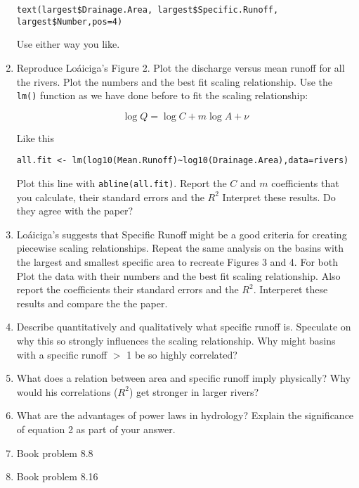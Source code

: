 \documentclass[11pt]{article}
\begin{document}
\begin{enumerate}
\begin{verbatim}
text(largest$Drainage.Area, largest$Specific.Runoff, largest$Number,pos=4)
\end{verbatim}

Use either way you like. 

\item Reproduce Lo\'aiciga's Figure 2.  Plot the discharge versus mean runoff for all the rivers. Plot the numbers and the best fit scaling relationship.  Use the \texttt{lm()} function as we have done before to fit the scaling relationship:

$$\log Q=\log C+m\log A+\nu$$

Like this

\begin{verbatim}
all.fit <- lm(log10(Mean.Runoff)~log10(Drainage.Area),data=rivers)
\end{verbatim}

Plot this line with \texttt{abline(all.fit)}.  Report the $C$ and $m$ coefficients that you calculate, their standard errors and the $R^2$  Interpret these results. Do they agree with the paper?

\item Lo\'aiciga's suggests that Specific Runoff might be a good criteria for creating piecewise scaling relationships.  Repeat the same analysis on the basins with the largest and smallest specific area to recreate Figures 3 and 4. For both Plot the data with their numbers and the best fit scaling relationship. Also report the coefficients their standard errors and the $R^2$.  Interperet these results and compare the the paper. 

\item Describe quantitatively and qualitatively what specific runoff is. Speculate on why this so strongly influences the scaling relationship. Why might basins with a specific runoff $>$ 1 be so highly correlated?

\item What does a relation between area and specific runoff imply physically? Why would his correlations ($R^2$) get stronger in larger rivers?

\item What are the advantages of power laws in hydrology? Explain the significance of equation 2 as part of your answer.

\item Book problem 8.8

\item Book problem 8.16


\end{enumerate}
\end{document}
